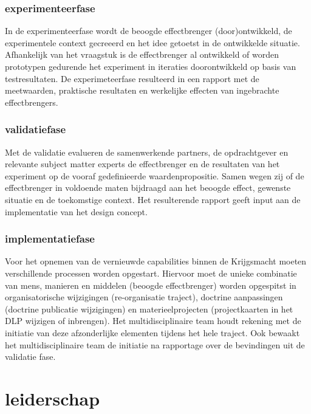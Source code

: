\documentclass[
]{book}
\begin{document}
\hypertarget{experimenteerfase}{%
\subsubsection{experimenteerfase}\label{experimenteerfase}}

In de experimenteerfase wordt de beoogde effectbrenger (door)ontwikkeld, de experimentele context gecreeerd en het idee getoetst in de ontwikkelde situatie. Afhankelijk van het vraagstuk is de effectbrenger al ontwikkeld of worden prototypen gedurende het experiment in iteraties doorontwikkeld op basis van testresultaten. De experimeteerfase resulteerd in een rapport met de meetwaarden, praktische resultaten en werkelijke effecten van ingebrachte effectbrengers.

\hypertarget{validatiefase}{%
\subsubsection{validatiefase}\label{validatiefase}}

Met de validatie evalueren de samenwerkende partners, de opdrachtgever en relevante subject matter experts de effectbrenger en de resultaten van het experiment op de vooraf gedefinieerde waardenpropositie. Samen wegen zij of de effectbrenger in voldoende maten bijdraagd aan het beoogde effect, gewenste situatie en de toekomstige context. Het resulterende rapport geeft input aan de implementatie van het design concept.

\hypertarget{implementatiefase}{%
\subsubsection{implementatiefase}\label{implementatiefase}}

Voor het opnemen van de vernieuwde capabilities binnen de Krijgsmacht moeten verschillende processen worden opgestart. Hiervoor moet de unieke combinatie van mens, manieren en middelen (beoogde effectbrenger) worden opgespitst in organisatorische wijzigingen (re-organisatie traject), doctrine aanpassingen (doctrine publicatie wijzigingen) en materieelprojecten (projectkaarten in het DLP wijzigen of inbrengen). Het multidisciplinaire team houdt rekening met de initiatie van deze afzonderlijke elementen tijdens het hele traject. Ook bewaakt het multidisciplinaire team de initiatie na rapportage over de bevindingen uit de validatie fase.

\hypertarget{leiderschap}{%
\section{leiderschap}\label{leiderschap}}
\end{document}
